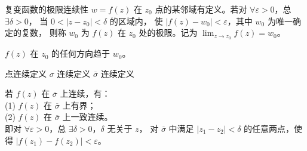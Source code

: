 \documentclass[12pt, a4paper, oneside, UTF8]{ctexbook}
\begin{document}
\begin{defn}{复变函数的极限}{连续性}
    $w=f(z)$ 在 $z_0$ 点的某邻域有定义。若对 $\forall \varepsilon >0$，总 $\exists \delta >0$，
    当 $0<\left\lvert z-z_0\right\rvert<\delta$ 的区域内，
    使 $\left\lvert f(z)-w_0\right\rvert<\varepsilon$，其中 $w_0$ 为唯一确定的复数，
    则称 $w_0$ 为 $f(z)$ 在 $z_0$ 处的极限。记为 $\lim_{z\rightarrow z_0}f(z)=w_0$。
\end{defn}
\begin{rmk}{}
    $f(z)$ 在 $z_0$ 的任何方向趋于 $w_0$。
\end{rmk}
点连续定义 \rightarrow $\sigma$ 连续定义 \rightarrow $\overline{\sigma}$ 连续定义

\noindent 若 $f(z)$ 在 $\overline{\sigma}$ 上连续，有：\\
(1) $f(z)$ 在 $\overline{\sigma}$ 上有界；\\
(2) $f(z)$ 在 $\overline{\sigma}$ 上一致连续。\\
即对 $\forall \varepsilon >0$，总 $\exists \delta >0$，$\delta$ 无关于 $z$，
对 $\overline{\sigma}$ 中满足 $\left\lvert z_1-z_2\right\rvert<\delta$
的任意两点，使得 $\left\lvert f(z_1)-f(z_2)\right\rvert<\varepsilon$。





\ifx\allfiles\undefined
\end{document}
